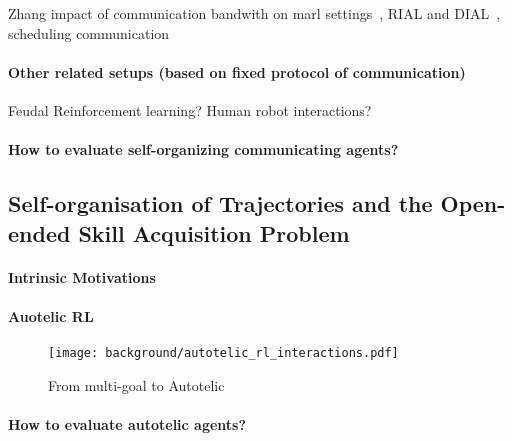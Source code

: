 Zhang impact of communication bandwith on marl settings~\citep{zhang2013coordinating}, RIAL and DIAL~\citep{foerster2016learning}, scheduling communication~\citep{kim2021communication}

\paragraph{Other related setups (based on fixed protocol of communication)}

Feudal Reinforcement learning? Human robot interactions?

\paragraph{How to evaluate self-organizing communicating agents?}


\subsection{Self-organisation of Trajectories and the Open-ended Skill Acquisition Problem}
\label{sec:self-orga-traj}

\paragraph{Intrinsic Motivations}

\paragraph{Auotelic RL}

\begin{figure}[!h]
\centering
\texttt{[image: background/autotelic\_rl\_interactions.pdf]}	
\caption{From multi-goal \rl to Autotelic \rl}
\label{fig:autotelic_interactions}
\end{figure}


\paragraph{How to evaluate autotelic agents?}



